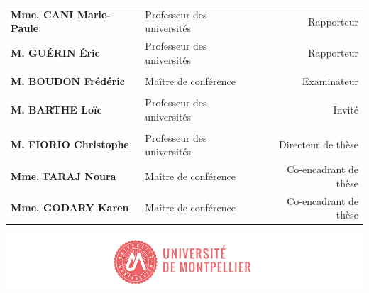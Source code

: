 \begin{titlepage}
{\begin{tabularx}{\textwidth}{l X r}
			\textbf{Mme. CANI Marie-Paule} & Professeur des universités & Rapporteur \\
			\textbf{M. GUÉRIN Éric} & Professeur des universités & Rapporteur \\
			\\
			\textbf{M. BOUDON Frédéric} & Maître de conférence & Examinateur \\
			\\
			\textbf{M. BARTHE Loïc} & Professeur des universités & Invité \\
			\\
			\textbf{M. FIORIO Christophe} & Professeur des universités & Directeur de thèse \\
			\textbf{Mme. FARAJ Noura} & Maître de conférence & Co-encadrant de thèse \\
			\textbf{Mme. GODARY Karen} & Maître de conférence & Co-encadrant de thèse
		\end{tabularx} 
		
		\vspace{\fill}
		\includegraphics[scale=1]{images/PhD_Couverture_LogoUM.png}
		\vspace{-15mm}}
\end{titlepage}

